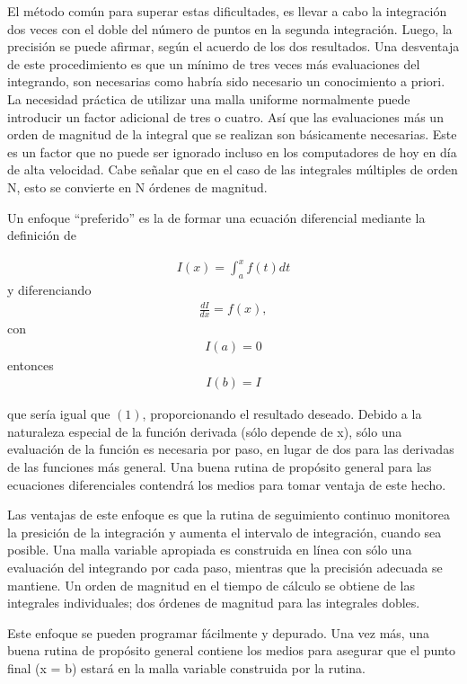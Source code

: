 El método común para superar estas dificultades,
es llevar a cabo la integración dos veces con el doble del número de puntos en la segunda integración.
Luego, la precisión se puede afirmar, según el acuerdo de los dos resultados.
Una desventaja de este procedimiento es que un mínimo de tres veces más evaluaciones del integrando,
son necesarias como habría sido necesario un conocimiento a priori.
La necesidad práctica de utilizar una malla uniforme normalmente puede introducir un factor adicional de tres o cuatro.
Así que las evaluaciones más un orden de magnitud de la integral que se realizan son básicamente necesarias.
Este es un factor que no puede ser ignorado incluso en los computadores de hoy en día de alta velocidad.
Cabe señalar que en el caso de las integrales múltiples de orden N, esto se convierte en N órdenes de magnitud.

Un enfoque ``preferido'' es la de formar una ecuación diferencial mediante la definición de

\begin{eqnarray}
	I(x) = \int_{a}^{x} f(t) dt
\end{eqnarray}
y diferenciando
\begin{eqnarray}
	\frac{dI}{dx} = f(x),
\end{eqnarray}
con
\begin{eqnarray}
	I(a) = 0
\end{eqnarray}
entonces
\begin{eqnarray}
	I(b) = I
\end{eqnarray}

que sería igual que $(1)$, proporcionando el resultado deseado.
Debido a la naturaleza especial de la función derivada (sólo depende de x),
sólo una evaluación de la función es necesaria por paso, en lugar de dos para las derivadas de las funciones más general.
Una buena rutina de propósito general para las ecuaciones diferenciales contendrá los medios para tomar ventaja de este hecho.

Las ventajas de este enfoque es que la rutina de seguimiento continuo monitorea la presición de la integración y
aumenta el intervalo de integración, cuando sea posible.
Una malla variable apropiada es construida en línea con sólo una evaluación del integrando por cada paso,
mientras que la precisión adecuada se mantiene.
Un orden de magnitud en el tiempo de cálculo se obtiene de las integrales individuales;
dos órdenes de magnitud para las integrales dobles.

Este enfoque se pueden programar fácilmente y depurado.
Una vez más, una buena rutina de propósito general contiene los medios para asegurar que el punto final
(x = b) estará en la malla variable construida por la rutina.
